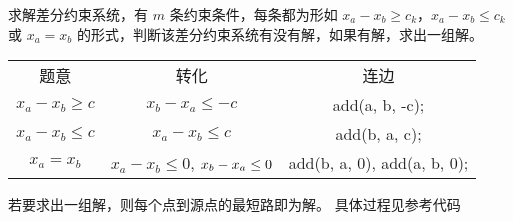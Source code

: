 求解差分约束系统，有 $m$ 条约束条件，每条都为形如 $x_a-x_b\geq c_k$，$x_a-x_b\leq c_k$ 或 $x_a=x_b$ 的形式，判断该差分约束系统有没有解，如果有解，求出一组解。

\begin{tabular}{ccc}
    题意 & 转化 & 连边 \\
    $x_a - x_b \geq c$ & $x_b - x_a \leq -c$ & add(a, b, -c); \\
    $x_a - x_b \leq c$ & $x_a - x_b \leq c$ & add(b, a, c); \\
    $x_a = x_b$ & $x_a - x_b \leq 0$, $\space x_b - x_a \leq 0$ & add(b, a, 0), add(a, b, 0); \\
  \end{tabular}

若要求出一组解，则每个点到源点的最短路即为解。
具体过程见参考代码